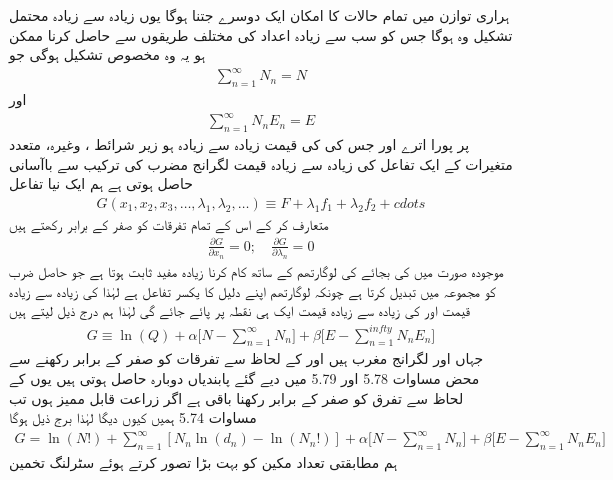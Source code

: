 ہراری توازن میں تمام حالات کا امکان ایک دوسرے جتنا ہوگا یوں زیادہ سے زیادہ محتمل تشکیل   وہ ہوگا جس کو سب سے زیادہ اعداد کی مختلف طریقوں سے حاصل کرنا ممکن ہو یہ وہ مخصوص تشکیل ہوگی جو 
\begin{align}
\sum_{n = 1}^{\infty} N_n = N
\end{align}
اور 
\begin{align}
\sum_{n = 1}^{\infty} N_n E_n = E
\end{align}
پر پورا اترے اور جس کی  کی قیمت زیادہ سے زیادہ ہو زیر شرائط ،   وغیرہ،  متعدد متغیرات کے ایک تفاعل  کی زیادہ سے زیادہ قیمت لگرانج مضرب کی ترکیب سے  باآسانی حاصل ہوتی ہے ہم ایک نیا تفاعل 
\begin{align} 
G (x_1 , x_2 , x_3 , \dotsc , \lambda_1 , \lambda_2 , \dotsc) \equiv F + \lambda_1 f_1 + \lambda_2 f_2 + cdots
\end{align}
متعارف کر کے اس کے تمام تفرقات کو صفر کے برابر رکھتے ہیں 
\begin{align}
\frac{\partial G}{\partial x_n} = 0; \quad \frac{\partial G}{\partial \lambda_n} = 0
\end{align}
موجودہ صورت میں  کی بجائے  کی لوگارتھم کے ساتھ کام کرنا زیادہ مفید ثابت ہوتا ہے جو حاصل ضرب کو مجموعہ میں تبدیل کرتا ہے چونکہ لوگارتھم اپنے دلیل کا یکسر تفاعل ہے لہٰذا  کی زیادہ سے زیادہ قیمت اور  کی زیادہ سے زیادہ قیمت ایک ہی نقطہ پر پائے جائے گی لہٰذا ہم درج ذیل لیتے ہیں 
\begin{align}
G \equiv \ln(Q) + \alpha \big [ N - \sum_{n = 1}^{\infty} N_n \big ] + \beta \big [ E - \sum_{n = 1}^{infty} N_n E_n \big ]
\end{align}
جہاں  اور  لگرانج مغرب ہیں  اور  کے لحاظ سے تفرقات کو صفر کے برابر رکھنے سے محض مساوات 5.78 اور 5.79 میں دیے گئے پابندیاں دوبارہ حاصل ہوتی ہیں یوں  کے لحاظ سے تفرق کو صفر کے برابر رکھنا باقی ہے اگر زراعت قابل ممیز ہوں تب مساوات 5.74 ہمیں کیوں ديگا لہٰذا برج ذیل ہوگا 
\begin{align}
G = \ln(N !) + \sum_{n = 1}^{\infty} [N_n \ln (d_n) - \ln(N_n !)] + \alpha \big [ N - \sum_{n = 1}^{\infty} N_n \big ] + \beta \big [ E - \sum_{n = 1}^{\infty} N_n E_n \big ]
\end{align}
ہم مطابقتی تعداد مکین  کو بہت بڑا تصور کرتے ہوئے سٹرلنگ تخمین 
